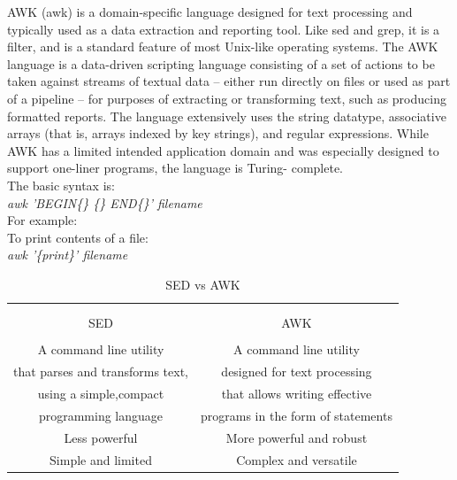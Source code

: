 \documentclass[12pt]{article}
\begin{document}
{
\begin{minipage}{\textwidth}
    AWK (awk) is a domain-specific language designed for text processing and 
    typically used as a data extraction and reporting tool. Like sed and grep, 
    it is a filter, and is a standard feature of most Unix-like operating 
    systems.
    The AWK language is a data-driven scripting language consisting of a set of 
    actions to be taken against streams of textual data – either run directly on files
    or used as part of a pipeline – for purposes of extracting or transforming text, 
    such as producing formatted reports. The language extensively uses the string 
    datatype, associative arrays (that is, arrays indexed by key strings), and 
    regular expressions. While AWK has a limited intended application domain and was 
    especially designed to support one-liner programs, the language is Turing-
    complete.\\
    The basic syntax is:\\
    \emph{awk 'BEGIN\{\} \{\} END\{\}' filename}\\
    For example:\\
    To print contents of a file:\\
    \emph{awk '\{print\}' filename}
\end{minipage}
}
\newpage
\setlength{\arrayrulewidth}{0.5mm}
\begin{center}
    \begin{table}
        \label{sedvsawk}
        \caption{\label{tab:sedvsawk}SED vs AWK}
        \begin{tabular}{|c|c|}
            \hline
            \\ & \\
            SED & AWK
            \\ & \\
            \hline
            A command line utility & A command line utility\\
            that parses and transforms text, & designed for text processing \\
            using a simple,compact  & that allows writing effective \\
            programming language & programs in the form of statements \\
            \hline
            Less powerful & More powerful and robust\\
            \hline
            Simple and limited & Complex and versatile\\
            \hline
        \end{tabular}
    \end{table}
\end{center}
\end{document}
